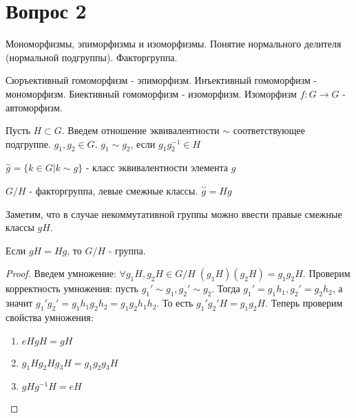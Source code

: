 \section{Вопрос 2}

Мономорфизмы, эпиморфизмы и изоморфизмы. Понятие нормального делителя (нормальной подгруппы). Факторгруппа.

\begin{defn}
  Сюръективный гомоморфизм - эпиморфизм. \newline
  Инъективный гомоморфизм - мономорфизм. \newline
  Биективный гомоморфизм - изоморфизм. \newline
  Изоморфизм $ f: G \rightarrow G $ - автоморфизм. \newline
\end{defn}

Пусть $ H \subset G $. Введем отношение эквивалентности $ \sim $ соответствующее подгруппе. $ g_1, g_2 \in G $. $ g_1 \sim g_2 $, если $ g_{1}g_{2}^{-1} \in H $

\begin{defn}
  $  \overset{\sim}{g} = \{ k \in G | k \sim g\} $ - класс эквивалентности элемента $g$ 
\end{defn}

\begin{defn}
  $ G/H $ - факторгруппа, левые смежные классы. $ \overset{\sim}{g} = Hg $
\end{defn}

Заметим, что в случае некоммутативной группы можно ввести правые смежные классы $ gH $.

\begin{thm}
  Если $ gH = Hg $, то $ G/H $ - группа.
\end{thm}

\begin{proof}  
  Введем умножение: $ \forall g_{1}H, g_{2}H \in G/H \; (g_{1}H)(g_{2}H) = g_{1}g_{2}H $.
  Проверим корректность умножения: пусть $ g_1' \sim g_1, g_2' \sim g_2 $. Тогда
  $ g_1' = g_{1}h_1, g_2' = g_{2}h_2 $, а значит $ g_{1}'g_{2}'= g_{1}h_{1}g_{2}h_{2} = g_{1}g_{2}h_{1}h_{2} $. 
  То есть $ g_{1}'g_{2}'H = g_{1}g_{2}H $. \newline
  Теперь проверим свойства умножения: 
  \begin{enumerate}
    \item $ eHgH = gH $
    \item $ g_{1}Hg_{2}Hg_{3}H = g_{1}g_{2}g_{3}H $
    \item $ gHg^{-1}H = eH $
  \end{enumerate}
\end{proof}

